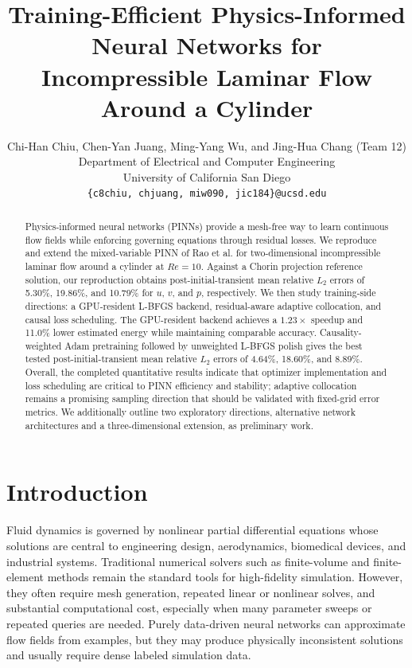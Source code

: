 \documentclass{article}
\title{Training-Efficient Physics-Informed Neural Networks for Incompressible Laminar Flow Around a Cylinder}
\author{%
  Chi-Han Chiu, Chen-Yan Juang, Ming-Yang Wu, and Jing-Hua Chang (Team 12) \\
  Department of Electrical and Computer Engineering\\
  University of California San Diego\\
  \texttt{\{c8chiu, chjuang, miw090, jic184\}@ucsd.edu}
}
\begin{document}
\maketitle

\begin{abstract}
Physics-informed neural networks (PINNs) provide a mesh-free way to learn continuous flow fields while enforcing governing equations through residual losses. We reproduce and extend the mixed-variable PINN of Rao et al. for two-dimensional incompressible laminar flow around a cylinder at $Re=10$. Against a Chorin projection reference solution, our reproduction obtains post-initial-transient mean relative $L_2$ errors of 5.30\%, 19.86\%, and 10.79\% for $u$, $v$, and $p$, respectively. We then study training-side directions: a GPU-resident L-BFGS backend, residual-aware adaptive collocation, and causal loss scheduling. The GPU-resident backend achieves a $1.23\times$ speedup and 11.0\% lower estimated energy while maintaining comparable accuracy. Causality-weighted Adam pretraining followed by unweighted L-BFGS polish gives the best tested post-initial-transient mean relative $L_2$ errors of 4.64\%, 18.60\%, and 8.89\%. Overall, the completed quantitative results indicate that optimizer implementation and loss scheduling are critical to PINN efficiency and stability; adaptive collocation remains a promising sampling direction that should be validated with fixed-grid error metrics. We additionally outline two exploratory directions, alternative network architectures and a three-dimensional extension, as preliminary work.
\end{abstract}

\section{Introduction}

Fluid dynamics is governed by nonlinear partial differential equations whose solutions are central to engineering design, aerodynamics, biomedical devices, and industrial systems. Traditional numerical solvers such as finite-volume and finite-element methods remain the standard tools for high-fidelity simulation. However, they often require mesh generation, repeated linear or nonlinear solves, and substantial computational cost, especially when many parameter sweeps or repeated queries are needed. Purely data-driven neural networks can approximate flow fields from examples, but they may produce physically inconsistent solutions and usually require dense labeled simulation data.
\end{document}
